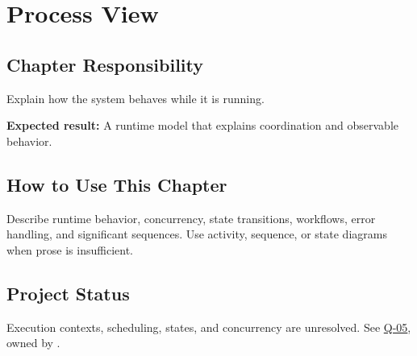 \chapter{Process View}
\section{Chapter Responsibility}
\label{Section:ProcessViewResponsibility}
Explain how the system behaves while it is running.

\noindent\textbf{Expected result:} A runtime model that explains coordination and observable behavior.

\section{How to Use This Chapter}
Describe runtime behavior, concurrency, state transitions, workflows, error handling, and significant sequences. Use activity, sequence, or state diagrams when prose is insufficient.

\section{Project Status}
Execution contexts, scheduling, states, and concurrency are unresolved.
See \hyperref[Question:Q-05]{Q-05}, owned by \DocumentOwner.
